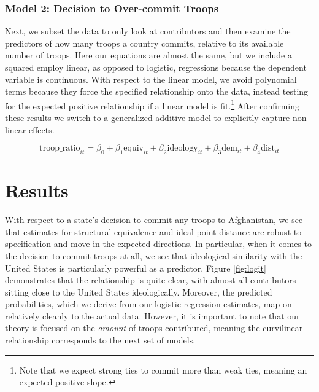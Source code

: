 \documentclass[12pt,letterpaper]{article}
\begin{document}
		\subsubsection{Model 2: Decision to Over-commit Troops}
			Next, we subset the data to only look at contributors and then examine the predictors of how many troops a country commits, relative to its available number of troops. Here our equations are almost the same, but we include a squared employ linear, as opposed to logistic, regressions because the dependent variable is continuous. With respect to the linear model, we avoid polynomial terms because they force the specified relationship onto the data, instead testing for the expected positive relationship if a linear model is fit.\footnote{Note that we expect strong ties to commit more than weak ties, meaning an expected positive slope.} After confirming these results we switch to a generalized additive model to explicitly capture non-linear effects.

			\vspace{-2em}
			\begin{equation*}
				\text{troop\_ratio}_{it} = \beta_0 + \beta_1\text{equiv}_{it} +
				\beta_2\text{ideology}_{it} + \beta_3\text{dem}_{it} + \beta_4\text{dist}_{it}
			\end{equation*}

\section{Results}
	With respect to a state's decision to commit any troops to Afghanistan, we see that estimates for structural equivalence and ideal point distance are robust to specification and move in the expected directions. In particular, when it comes to the decision to commit troops at all, we see that ideological similarity with the United States is particularly powerful as a predictor. Figure \ref{fig:logit} demonstrates that the relationship is quite clear, with almost all contributors sitting close to the United States ideologically. Moreover, the predicted probabilities, which we derive from our logistic regression estimates, map on relatively cleanly to the actual data. However, it is important to note that our theory is focused on the \textit{amount} of troops contributed, meaning the curvilinear relationship corresponds to the next set of models.
\end{document}
